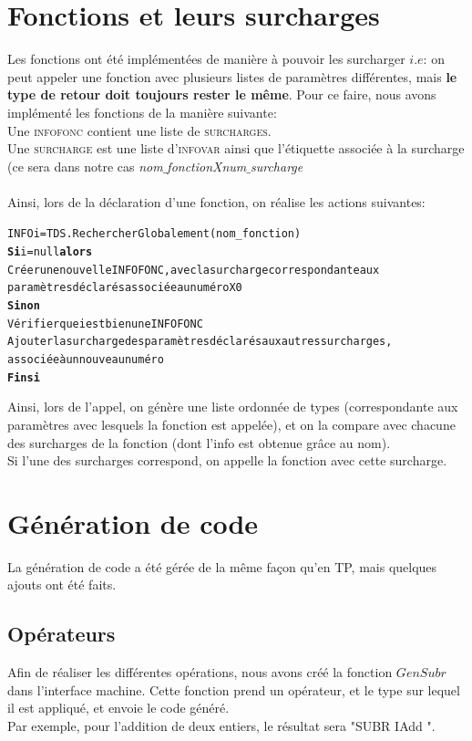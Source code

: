 \documentclass[11pt,a4paper]{report}
\begin{document}
\section{Fonctions et leurs surcharges}

Les fonctions ont été implémentées de manière à pouvoir les surcharger $i.e$: on peut appeler une fonction avec plusieurs listes de paramètres différentes, mais {\bf le type de retour doit toujours rester le même}. Pour ce faire, nous avons implémenté les fonctions de la manière suivante: \\
Une \textsc{infofonc} contient une liste de \textsc{surcharges}. \\
Une \textsc{surcharge} est une liste d'\textsc{infovar} ainsi que l'étiquette associée à la surcharge (ce sera dans notre cas \textsl{nom$\_$fonctionXnum$\_$surcharge}  \\\\
Ainsi, lors de la déclaration d'une fonction, on réalise les actions suivantes: 
\begin{alltt}
INFO i = TDS.RechercherGlobalement(nom_fonction)
  {\bf Si} i = null {\bf alors}
      Créer une nouvelle INFOFONC, avec la surcharge correspondante aux 
      paramètres déclarés associée au numéro X0
  {\bf Sinon}
      Vérifier que i est bien une INFOFONC
      Ajouter la surcharge des paramètres déclarés aux autres surcharges,
      associée à un nouveau numéro
  {\bf Fin si} 
\end{alltt}

Ainsi, lors de l'appel, on génère une liste ordonnée de types (correspondante aux paramètres avec lesquels la fonction est appelée), et on la compare avec chacune des surcharges de la fonction (dont l'info est obtenue grâce au nom). \\ 
Si l'une des surcharges correspond, on appelle la fonction avec cette surcharge.

\section{Génération de code}

La génération de code a été gérée de la même façon qu'en TP, mais quelques ajouts ont été faits.

\subsection{Opérateurs}

Afin de réaliser les différentes opérations, nous avons créé la fonction 
$GenSubr$ dans l'interface machine. Cette fonction prend un opérateur, et le type sur lequel il est appliqué, et envoie le code généré. \\
Par exemple, pour l'addition de deux entiers, le résultat sera "SUBR IAdd ".
\end{document}
